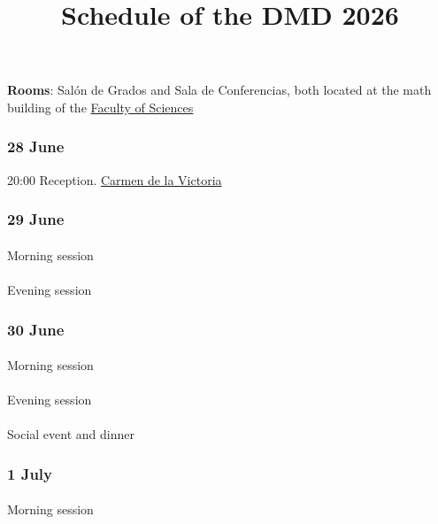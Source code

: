\documentclass[
  letterpaper,
  DIV=11,
  numbers=noendperiod]{scrartcl}
\title{Schedule of the DMD 2026}
\author{}
\date{}
\makeatletter
\let\oldparagraph\paragraph
\renewcommand{\paragraph}{
    \@ifstar
      \xxxParagraphStar
      \xxxParagraphNoStar
  }
\newcommand{\xxxParagraphStar}[1]{\oldparagraph*{#1}\mbox{}}
\newcommand{\xxxParagraphNoStar}[1]{\oldparagraph{#1}\mbox{}}
\makeatother
\begin{document}
\maketitle


\textbf{Rooms}: Salón de Grados and Sala de Conferencias, both located
at the math building of the \href{https://fciencias.ugr.es/}{Faculty of
Sciences}

\subsubsection{28 June}\label{june}

20:00 Reception. \href{https://carmendelavictoria.ugr.es/}{Carmen de la
Victoria}

\subsubsection{29 June}\label{june-1}

\paragraph{Morning session}\label{morning-session}

\paragraph{Evening session}\label{evening-session}

\subsubsection{30 June}\label{june-2}

\paragraph{Morning session}\label{morning-session-1}

\paragraph{Evening session}\label{evening-session-1}

\paragraph{Social event and dinner}\label{social-event-and-dinner}

\subsubsection{1 July}\label{july}

\paragraph{Morning session}\label{morning-session-2}
\end{document}
